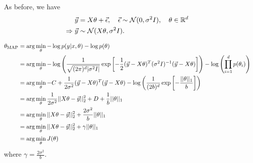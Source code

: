 \begin{answer}

As before, we have
\begin{align*}
\vec{y} &= X\theta + \vec{\epsilon},
    \quad \vec{\epsilon} \sim \mathcal{N}(0, \sigma^2I),
    \quad \theta \in {\mathbb R}^{{d}} \\
\Rightarrow \vec{y} &\sim \mathcal{N}(X\theta, \sigma^2I).
\end{align*}

\begin{align*}
\theta_\text{MAP} &= \arg\min_\theta - \log p(y|x,\theta) - \log p (\theta) \\
&= \arg\min_\theta -\log \left(\frac{1}{\sqrt{(2\pi)^{{d}} |\sigma^2I|}}\exp\left[-\frac{1}{2} (\vec{y} - X\theta)^T (\sigma^2 I)^{-1} (\vec{y} - X\theta) \right]\right) - \log \left(\prod_{i=1}^{{d}} p(\theta_i) \right) \\
&= \arg\min_\theta -C + \frac{1}{2 \sigma^2}(\vec{y} - X\theta)^T (\vec{y} - X\theta) - \log \left(\frac{1}{(2b)^{{d}}} \exp\left[- \frac{||\theta||_1}{b} \right]\right) \\
&= \arg\min_\theta \frac{1}{2 \sigma^2} ||X\theta - \vec{y}||_2^2 + D + \frac{1}{b} ||\theta||_1 \\
&= \arg\min_\theta ||X\theta - \vec{y}||_2^2 + \frac{2 \sigma^2}{b} ||\theta||_1 \\
&= \arg\min_\theta ||X\theta - \vec{y}||_2^2 + \gamma ||\theta||_1 \\
&= \arg\min_\theta J(\theta)
\end{align*}
where $\gamma = \frac{2 \sigma^2}{b}$.

\end{answer}
